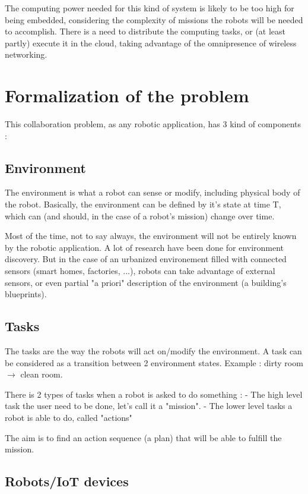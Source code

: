 \documentclass[conference]{IEEEtran}
\begin{document}
The computing power needed for this kind of system is likely to be too high for being embedded, considering the complexity of missions the robots will be needed to accomplish.
There is a need to distribute the computing tasks, or (at least partly) execute it in the cloud, taking advantage of the omnipresence of wireless networking.

\section{Formalization of the problem}

This collaboration problem, as any robotic application, has 3 kind of components : 

\subsection{Environment}

The environment is what a robot can sense or modify, including physical body of the robot.
Basically, the environment can be defined by it's state at time T, which can (and should, in the case of a robot's mission) change over time.

Most of the time, not to say always, the environment will not be entirely known by the robotic application.
A lot of research have been done for environment discovery.
But in the case of an urbanized environement filled with connected sensors (smart homes, factories, ...), robots can take advantage of external sensors, or even partial "a priori" description of the environment (a building's blueprints).

\subsection{Tasks}

The tasks are the way the robots will act on/modify the environment.
A task can be considered as a transition between 2 environment states.
Example : dirty room $\rightarrow$ clean room.

There is 2 types of tasks when a robot is asked to do something : 
 - The high level task the user need to be done, let's call it a "mission".
 - The lower level tasks a robot is able to do, called "actions"

The aim is to find an action sequence (a plan) that will be able to fulfill the mission.

\subsection{Robots/IoT devices}
\end{document}

